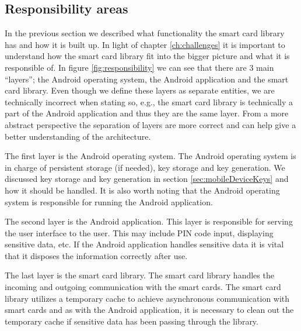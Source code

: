 \newpage
\subsection{Responsibility areas}
In the previous section we described what functionality the smart card library has and how it is built up. In light of chapter \ref{ch:challenges} it is important to understand how the smart card library fit into the bigger picture and what it is responsible of. In figure \ref{fig:responsibility} we can see that there are 3 main ``layers''; the Android operating system, the Android application and the smart card library. Even though we define these layers as separate entities, we are technically incorrect when stating so, e.g., the smart card library is technically a part of the Android application and thus they are the same layer. From a more abstract perspective the separation of layers are more correct and can help give a better understanding of the architecture.

 The first layer is the Android operating system. The Android operating system is in charge of persistent storage (if needed), key storage and key generation. We discussed key storage and key generation in section \ref{sec:mobileDeviceKeys} and how it should be handled. It is also worth noting that the Android operating system is responsible for running the Android application.

The second layer is the Android application. This layer is responsible for serving the user interface to the user. This may include PIN code input, displaying sensitive data, etc. If the Android application handles sensitive data it is vital that it disposes the information correctly after use.

The last layer is the smart card library. The smart card library handles the incoming and outgoing communication with the smart cards. The smart card library utilizes a temporary cache to achieve asynchronous communication with smart cards and as with the Android application, it is necessary to clean out the temporary cache if sensitive data has been passing through the library.

